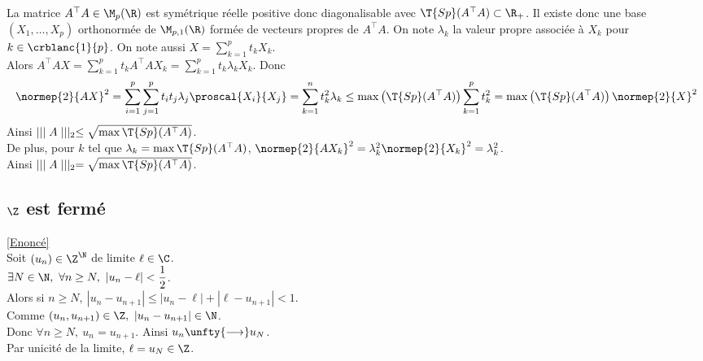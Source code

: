 \documentclass{book}
\begin{document}
\begin{enumerate}
		La matrice $A^\top A\in \M_p(\R)$ est symétrique réelle positive donc diagonalisable avec $\T{Sp}(A^\top A)\subset\R_+$. Il existe donc une base $(X_1,\dots,X_p)$ orthonormée de $\M_{p,1}(\R)$ formée de vecteurs propres de $A^\top A$. On note $\lambda_k$ la valeur propre associée à $X_k$ pour $k\in \crblanc{1}{p}$. On note aussi $X=\displaystyle\sum_{k=1}^pt_kX_k$.\\
		Alors $A^\top AX=\displaystyle\sum_{k=1}^pt_kA^\top AX_k=\sum_{k=1}^pt_k\lambda_kX_k$. Donc
		$$\normep{2}{AX}^2=\sum_{i=1}^p\sum_{j=1}^pt_it_j\lambda_j\proscal{X_i}{X_j}=\sum_{k=1}^nt_k^2\lambda_k\leq \max\left(\T{Sp}(A^\top A)\right)\sum_{k=1}^pt_k^2=\max\left(\T{Sp}(A^\top A)\right)\normep{2}{X}^2$$
		Ainsi $\mid\mid\mid A\mid\mid\mid_2\leq \sqrt{\max\T{Sp}(A^\top A)}$.\\
		De plus, pour $k$ tel que $\lambda_k=\max\T{Sp}(A^\top A)$, $\normep{2}{AX_k}^2=\lambda_k^2\normep{2}{X_k}^2=\lambda_k^2$.\\
		Ainsi $\mid\mid\mid A\mid\mid\mid_2=\sqrt{\max\T{Sp}(A^\top A)}$.
	\end{enumerate}
	
	\subsection{$\Z$ est fermé }
	\label{sec:z-est-ferme-etoile1}
	\textcolor{blue}{\hyperref[Z est fermé]{[Enoncé]}}\\
	\label{Topologie de Z}
	Soit $(u_n)\in \Z^\N$ de limite $\ell\in \C$.\\
	$\exists N\in \N,\ \forall n\geq N,\ |u_n-\ell|<\displaystyle\frac{1}{2}$.\\
	Alors si $n\geq N,\ |u_n-u_{n+1}|\leq |u_n-\ell|+|\ell-u_{n+1}|<1$.\\
	Comme $(u_n,u_{n+1})\in \Z,\ |u_n-u_{n+1}|\in \N$.\\
	Donc $\forall n\geq N,\ u_n=u_{n+1}$. Ainsi $u_n\unfty{\longrightarrow}u_N$.\\
	Par unicité de la limite, $\ell=u_N\in \Z$.
	
\end{document}
